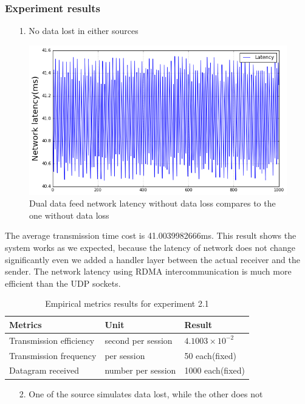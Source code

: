 \documentclass[11pt,openright,a4paper]{report}
\begin{document}
\subsubsection{Experiment results}
\begin{itemize}
	\item[1.] No data lost in either sources
\end{itemize}
\begin{figure}[H]
\centering
\includegraphics[width=0.7\linewidth]{picture/experiments/exp2/dualLatency}
\caption{Dual data feed network latency without data loss compares to the one without data loss}
\label{fig:dualLatency}
\end{figure}
The average transmission time cost is 41.0039982666ms. This result shows the system works as we expected, because the latency of network does not change significantly even we added a handler layer between the actual receiver and the sender. The network latency using RDMA intercommunication is much more efficient than the UDP sockets.\\ 
\begin{table}[H]
	\centering
	\caption{Empirical metrics results for experiment 2.1}
	\label{my-label}
	\begin{tabular}{@{}lll@{}}
		\toprule
		Metrics                 & Unit               & Result                 \\ \midrule
		Transmission efficiency & second per session & $4.1003\times 10^{-2}$ \\
		Transmission frequency  & per session        & 50 each(fixed)              \\
		Datagram received       & number per session & 1000 each(fixed)            \\ \bottomrule
	\end{tabular}
\end{table}
\begin{itemize}
	\item[2.] One of the source simulates data lost, while the other does not
\end{itemize}
\end{document}
